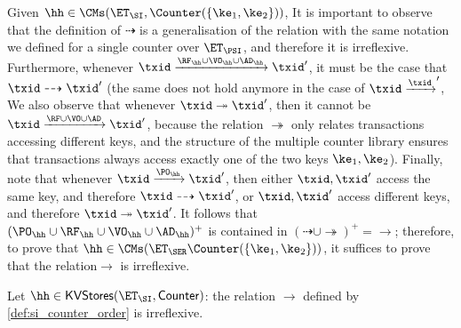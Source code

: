 Given $\hh \in \CMs(\ET_{\SI}, \Counter(\{\ke_1, \ke_2\}))$, 
It is important to observe that the definition of $\dashrightarrow$ is a generalisation of the relation 
with the same notation we defined for a single counter over $\ET_{\PSI}$, and therefore it is irreflexive. 
Furthermore, whenever $\txid \xrightarrow{\RF_{\hh} \cup \VO_{\hh} \cup \AD_{\hh}} \txid'$, it must be the case that 
$\txid \dashrightarrow \txid'$ (the same does not hold anymore in the case of $\txid \xrightarrow \txid'$, 
We also observe that whenever $\txid \twoheadrightarrow \txid'$, then it cannot be $\txid \xrightarrow{\RF \cup \VO \cup \AD} \txid'$, 
because the relation $\twoheadrightarrow$ only relates transactions accessing different keys, and the structure of 
the multiple counter library ensures that transactions always access exactly one of the two keys $\ke_1, \ke_2$). 
Finally, note that whenever $\txid \xrightarrow{\PO_{\hh}} \txid'$, then either $\txid, \txid'$ access the same 
key, and therefore $\txid \dashrightarrow \txid'$, or $\txid, \txid'$ access different keys, and therefore 
$\txid \twoheadrightarrow \txid'$. It follows that $(\PO_{\hh} \cup \RF_{\hh} \cup \VO_{\hh} \cup \AD_{\hh})^{+}$ 
is contained in $(\dashrightarrow \cup \twoheadrightarrow)^{+} = \rightarrow$; therefore, 
to prove that $\hh \in \CMs(\ET_{\SER}  \Counter(\{\ke_1, \ke_2\}))$, it suffices to prove that 
the relation$\rightarrow$ is irreflexive.
%

\begin{proposition}
Let $\hh \in \mathsf{KVStores}(\ET_{\SI}, \mathsf{Counter})$: the relation $\rightarrow$ 
defined by \cref{def:si_counter_order} is irreflexive.
\end{proposition}

